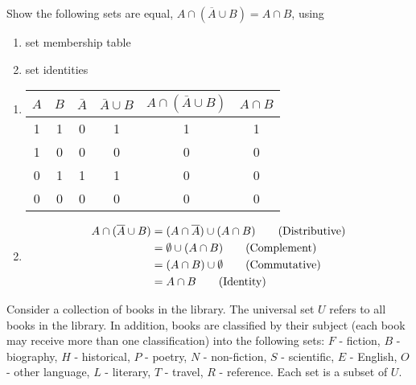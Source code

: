 \begin{questions}
 Show the following sets are equal,  $A \cap (\overline{A} \cup B) = A \cap B$, using
\begin{enumerate}[label=(\alph*),itemsep=0pt,parsep=0pt,
        topsep=0pt,partopsep=0pt]
    \item set membership table
    \item set identities
\end{enumerate}
	\ifprintanswers
		\vspace{-10pt}
	\fi
	\begin{solution}
		\begin{enumerate}[label=(\alph*),itemsep=0pt,parsep=0pt,
        topsep=0pt,partopsep=0pt]
       	\item  
        \scriptsize
        \hspace{0.5in} \begin{tabular}{|ccc|cc|c|}
            $A$ & $B$ & $\bar{A}$ & $\bar{A} \cup B$ & $A \cap (\bar{A} \cup B)$ 
                & $A \cap B$ \\
            \hline
            1 & 1 & 0 &   1 & 1 &   1 \\
            1 & 0 & 0 &   0 & 0 &   0 \\
            0 & 1 & 1 &   1 & 0 &   0 \\
            0 & 0 & 0 &   0 & 0 &   0 \\
        \end{tabular}
        \normalsize

       	\item 
		\begin{align*}
			A \cap (\overline{A} \cup B) &= (A \cap \overline{A}) \cup (A \cap B) \tag{Distributive} \\
			 &= \emptyset \cup (A \cap B) \tag{Complement} \\
			 &= (A \cap B) \cup \emptyset  \tag{Commutative} \\
			 &= A \cap B \tag{Identity}
		\end{align*}
	\end{enumerate}
	\end{solution}





 Consider a collection of books in the library.  The universal set $U$ refers to all books in the library.  In addition, books are classified by their subject (each book may receive more than one classification) into the following sets: $F$ - fiction, $B$ - biography, $H$ - historical, $P$ - poetry, $N$ - non-fiction, $S$ - scientific, $E$ - English, $O$ - other language, $L$ - literary, $T$ - travel, $R$ - reference.  Each set is a subset of $U$. 


\end{questions}
